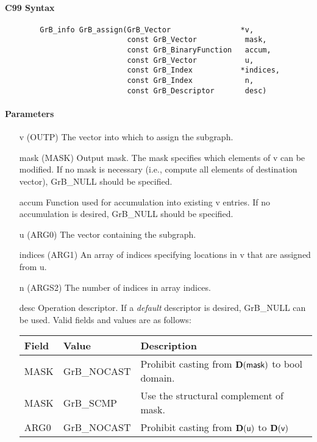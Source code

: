 \paragraph{C99 Syntax}

\begin{verbatim}
        GrB_info GrB_assign(GrB_Vector                *v,
                            const GrB_Vector           mask,
                            const GrB_BinaryFunction   accum,
                            const GrB_Vector           u,
                            const GrB_Index           *indices,
                            const GrB_Index            n,
                            const GrB_Descriptor       desc)
\end{verbatim}

\paragraph{Parameters}

\begin{itemize}[leftmargin=1.1in]
    \item[{\sf v}]   ({\sf OUTP}) The vector into which to assign the subgraph.
    \item[{\sf mask}] ({\sf MASK}) Output mask. The mask specifies which elements
    of {\sf v} can be modified. If no mask is necessary (i.e., compute all
    elements of destination vector), {\sf GrB\_NULL} should be specified.
    \item[{\sf accum}] Function used for accumulation into existing {\sf v} entries.  If no accumulation
                        is desired, {\sf GrB\_NULL} should be specified.
    \item[{\sf u}]   ({\sf ARG0}) The vector containing the subgraph.
    \item[{\sf indices}]     ({\sf ARG1}) An array of indices specifying locations in {\sf v} that
                       are assigned from {\sf u}.
    \item[{\sf n}]    ({\sf ARGS2}) The number of indices in array {\sf indices}.
    \item[{\sf desc}]   Operation descriptor. If a
    \emph{default} descriptor is desired, {\sf GrB\_NULL} can be
    used. Valid fields and values are as follows: \\
    \begin{tabular}{lll}
    Field  & Value & Description \\
    \hline
    {\sf MASK} & {\sf GrB\_NOCAST} & Prohibit casting from $\bold{D}({\sf mask})$ to {\sf bool} domain. \\
    {\sf MASK} & {\sf GrB\_SCMP} & Use the structural complement of {\sf mask}. \\
    {\sf ARG0} & {\sf GrB\_NOCAST} & Prohibit casting from $\bold{D}({\sf u})$ to $\bold{D}({\sf v})$ \\
    \end{tabular}
\end{itemize}

